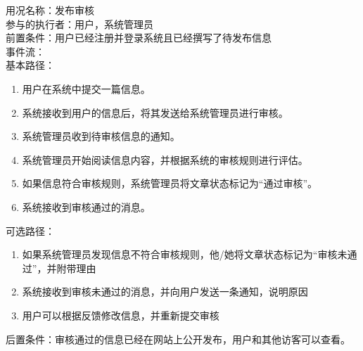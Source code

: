 \begin{framed}
\noindent
用况名称：发布审核\\
参与的执行者：用户，系统管理员\\
前置条件：用户已经注册并登录系统且已经撰写了待发布信息\\
事件流：\\
基本路径：
\begin{enumerate}[itemsep=2pt,topsep=0pt,parsep=0pt,itemindent=1em]
    \item 用户在系统中提交一篇信息。
    \item 系统接收到用户的信息后，将其发送给系统管理员进行审核。
    \item 系统管理员收到待审核信息的通知。
    \item 系统管理员开始阅读信息内容，并根据系统的审核规则进行评估。
    \item 如果信息符合审核规则，系统管理员将文章状态标记为“通过审核”。
    \item 系统接收到审核通过的消息。
    \end{enumerate}
\noindent
可选路径：\par
   \begin{enumerate}[itemsep=2pt,topsep=0pt,parsep=0pt,itemindent=1em]  
       \item 如果系统管理员发现信息不符合审核规则，他/她将文章状态标记为“审核未通过”，并附带理由
       \item 系统接收到审核未通过的消息，并向用户发送一条通知，说明原因
       \item 用户可以根据反馈修改信息，并重新提交审核  
   \end{enumerate} 
后置条件：审核通过的信息已经在网站上公开发布，用户和其他访客可以查看。
\end{framed}

